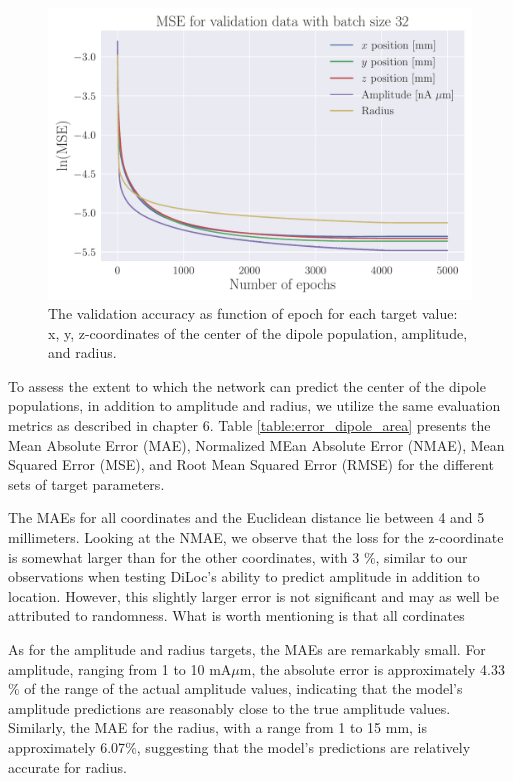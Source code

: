 \documentclass[a4paper, UKenglish, 11pt]{uiomaster}
\begin{document}
\begin{figure}[!htb]
    \centering
    \includegraphics[width=\linewidth]{figures/mse_targets_area_32_0.001_0.35_0.1_0.0_5000_(0).pdf}
    \caption{The validation accuracy as function of epoch for each target value: x, y, z-coordinates of the center of the dipole population, amplitude, and radius. }
    \label{fig:dipole_area_target_result}
\end{figure}


To assess the extent to which the network can predict the center of the dipole populations, in addition to amplitude and radius, we utilize the same evaluation metrics as described in chapter 6. Table \ref{table:error_dipole_area} presents the Mean Absolute Error (MAE), Normalized MEan Absolute Error (NMAE), Mean Squared Error (MSE), and Root Mean Squared Error (RMSE) for the different sets of target parameters.

The MAEs for all coordinates and the Euclidean distance lie between 4 and 5 millimeters. Looking at the NMAE, we observe that the loss for the z-coordinate is somewhat larger than for the other coordinates, with 3 $\%$, similar to our observations when testing DiLoc's ability to predict amplitude in addition to location. However, this slightly larger error is not significant and may as well be attributed to randomness. What is worth mentioning is that all cordinates


As for the amplitude and radius targets, the MAEs are remarkably small. For amplitude, ranging from 1 to 10 mA$\mu$m, the absolute error is approximately 4.33$\%$ of the range of the actual amplitude values, indicating that the model's amplitude predictions are reasonably close to the true amplitude values. Similarly, the MAE for the radius, with a range from 1 to 15 mm, is approximately 6.07$\%$, suggesting that the model's predictions are relatively accurate for radius.
\end{document}
